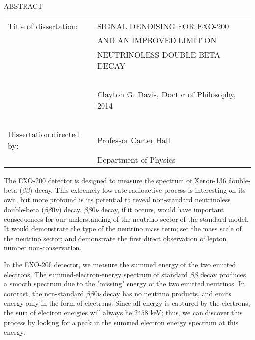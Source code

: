 
\hbox{\ }

\renewcommand{\baselinestretch}{1}
\small \normalsize

\begin{center}
\large{{ABSTRACT}} 

\vspace{3em} 

\end{center}
\hspace{-.15in}
\begin{tabular}{ll}
Title of dissertation:    & {\large  SIGNAL DENOISING FOR EXO-200 }\\
&                           {\large AND AN IMPROVED LIMIT ON} \\
&                           {\large NEUTRINOLESS DOUBLE-BETA DECAY} \\
\ \\
&                          {\large  Clayton G. Davis, Doctor of Philosophy, 2014} \\
\ \\
Dissertation directed by: & {\large  Professor Carter Hall} \\
&  				{\large	 Department of Physics } \\
\end{tabular}

\vspace{3em}

\renewcommand{\baselinestretch}{2}
\large \normalsize

The EXO-200 detector is designed to measure the spectrum of Xenon-136 double-beta ($\beta\beta$) decay.  This extremely low-rate radioactive process is interesting on its own, but more profound is its potential to reveal non-standard neutrinoless double-beta ($\beta\beta 0\nu$) decay.  $\beta\beta 0\nu$ decay, if it occurs, would have important consequences for our understanding of the neutrino sector of the standard model.  It would demonstrate the type of the neutrino mass term; set the mass scale of the neutrino sector; and demonstrate the first direct observation of lepton number non-conservation.

In the EXO-200 detector, we measure the summed energy of the two emitted electrons.  The summed-electron-energy spectrum of standard $\beta\beta$ decay produces a smooth spectrum due to the "missing" energy of the two emitted neutrinos.  In contrast, the non-standard $\beta\beta 0\nu$ decay has no neutrino products, and emits energy only in the form of electrons.  Since all energy is captured by the electrons, the sum of electron energies will always be $2458$ keV; thus, we can discover this process by looking for a peak in the summed electron energy spectrum at this energy.

